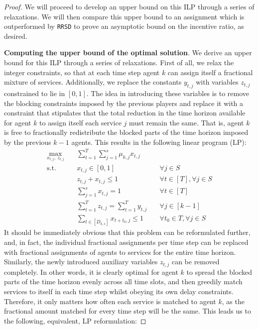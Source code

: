\documentclass[letterpaper,11pt]{article}
\begin{document}
\begin{proof}
    We will proceed to develop an upper bound on this ILP through a series of relaxations. We will then compare this upper bound to an assignment which is outperformed by \texttt{RRSD} to prove an asymptotic bound on the incentive ratio, as desired. 
    
    \textbf{Computing the upper bound of the optimal solution}. We derive an upper bound for this ILP through a series of relaxations. First of all, we relax the integer constraints, so that at each time step agent $k$ can assign itself a fractional mixture of services. Additionally, we replace the constants $y_{t , j}$ with variables $z_{t, j}$ constrained to lie in $[0, 1]$. The idea in introducing these variables is to remove the blocking constraints imposed by the previous players and replace it with a constraint that stipulates that the total reduction in the time horizon available for agent $k$ to assign itself each service $j$ must remain the same. That is, agent $k$ is free to fractionally redistribute the blocked parts of the time horizon imposed by the previous $k-1$ agents. This results in the following linear program (LP):
    \begin{align*}
        \max_{x_{t,j},\: z_{t, j}}\quad & \sum^{T}_{t=1}\sum^{s}_{j=1}\mu_{k,j}x_{t, j}  \\
        \text{s.t. }\quad &  x_{t, j} \in [0, 1] \quad &\forall j \in S\\
        \quad &z_{t, j} + x_{t, j} \leq 1 \quad &\forall t \in [T], \forall j \in S \\
        &\sum^{s}_{j=1}x_{t, j} = 1 \quad &\forall t \in [T] \\
        &\sum_{t=1}^{T}z_{t, j} = \sum^{T}_{t=1}y_{t, j} \quad &\forall j \in [k-1]\\
        &\sum_{t \in [D_{k, s}]}x_{t + t_{0}, j} \leq 1 \quad &\forall t_{0} \in T, \forall j \in S
    \end{align*}
    It should be immediately obvious that this problem can be reformulated further, and, in fact, the individual fractional assignments per time step can be replaced with fractional assignments of agents to services for the entire time horizon. Similarly, the newly introduced auxiliary variables $z_{t, j}$ can be removed completely. In other words, it is clearly optimal for agent $k$ to spread the blocked parts of the time horizon evenly across all time slots, and then greedily match services to itself in each time step whilst obeying its own delay constraints. Therefore, it only matters how often each service is matched to agent $k$, as the fractional amount matched for every time step will be the same. This leads us to the following, equivalent, LP reformulation:

\end{proof}
\end{document}
